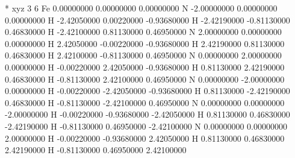 * xyz 3 6
Fe 0.00000000 0.00000000 0.00000000
N -2.00000000 0.00000000 0.00000000
H -2.42050000 0.00220000 -0.93680000
H -2.42190000 -0.81130000 0.46830000
H -2.42100000 0.81130000 0.46950000
N 2.00000000 0.00000000 0.00000000
H 2.42050000 -0.00220000 -0.93680000
H 2.42190000 0.81130000 0.46830000
H 2.42100000 -0.81130000 0.46950000
N 0.00000000 2.00000000 0.00000000
H -0.00220000 2.42050000 -0.93680000
H 0.81130000 2.42190000 0.46830000
H -0.81130000 2.42100000 0.46950000
N 0.00000000 -2.00000000 0.00000000
H -0.00220000 -2.42050000 -0.93680000
H 0.81130000 -2.42190000 0.46830000
H -0.81130000 -2.42100000 0.46950000
N 0.00000000 0.00000000 -2.00000000
H -0.00220000 -0.93680000 -2.42050000
H 0.81130000 0.46830000 -2.42190000
H -0.81130000 0.46950000 -2.42100000
N 0.00000000 0.00000000 2.00000000
H -0.00220000 -0.93680000 2.42050000
H 0.81130000 0.46830000 2.42190000
H -0.81130000 0.46950000 2.42100000

